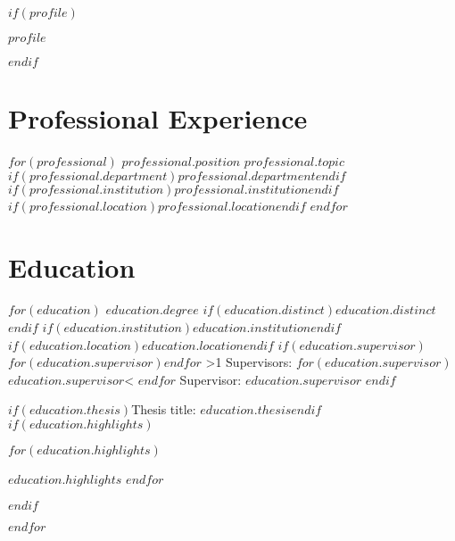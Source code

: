 \documentclass[10pt]{deedy-resume-openfont}
\newcounter{counterA}
\newcounter{counterB}
\begin{document}
$if(profile)$
\begin{minipage}[t]{\textwidth}
$profile$
\end{minipage}
\sectionsep
$endif$

\section{Professional Experience}
$for(professional)$
%
{$professional.position$}%
{$professional.topic$}%
{$if(professional.department)$$professional.department$$endif$}%
{$if(professional.institution)$\emph{$professional.institution$}$endif$}%
{$if(professional.location)$$professional.location$$endif$}%
{}%
$endfor$
\sectionsep
\section{Education}
$for(education)$
%
{$education.degree$}%
{$if(education.distinct)$$education.distinct$$endif$}%
{$if(education.institution)$\emph{$education.institution$}$endif$}%
{$if(education.location)$$education.location$$endif$}%
{$if(education.supervisor)$%
\setcounter{counterA}{0}%
\setcounter{counterB}{0}%
\def\variable{0}
$for(education.supervisor)$$endfor$%
\ifnum\value{counterA}>1%
Supervisors: 
$for(education.supervisor)$%
%
$education.supervisor$\ifnum\value{counterB}<\value{counterA}\customsep\fi%
$endfor$%
\else%
Supervisor: $education.supervisor$%
\fi%
$endif$%
}%
{$if(education.thesis)$Thesis title: \textbf{$education.thesis$}$endif$
$if(education.highlights)$%
{\small%
\begin{tightemize}%
$for(education.highlights)$
\item $education.highlights$%
$endfor$
\end{tightemize}}%
$endif$%
}%
$endfor$
\sectionsep
\end{document}
